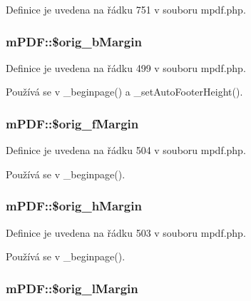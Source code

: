 Definice je uvedena na řádku 751 v souboru mpdf.\-php.

\hypertarget{classm_p_d_f_a2e908dbc80a64e5171b7b9d4f236c4c6}{
\subsubsection[{\$orig\-\_\-b\-Margin}]{\setlength{\rightskip}{0pt plus 5cm}m\-P\-D\-F\-::\$orig\-\_\-b\-Margin}}\label{classm_p_d_f_a2e908dbc80a64e5171b7b9d4f236c4c6}


Definice je uvedena na řádku 499 v souboru mpdf.\-php.



Používá se v \-\_\-beginpage() a \-\_\-set\-Auto\-Footer\-Height().

\hypertarget{classm_p_d_f_aa23dee3611c49dd27d5d7fe84614fb28}{
\subsubsection[{\$orig\-\_\-f\-Margin}]{\setlength{\rightskip}{0pt plus 5cm}m\-P\-D\-F\-::\$orig\-\_\-f\-Margin}}\label{classm_p_d_f_aa23dee3611c49dd27d5d7fe84614fb28}


Definice je uvedena na řádku 504 v souboru mpdf.\-php.



Používá se v \-\_\-beginpage().

\hypertarget{classm_p_d_f_ab6db5737d6640df2ed8f81d626c3f3fc}{
\subsubsection[{\$orig\-\_\-h\-Margin}]{\setlength{\rightskip}{0pt plus 5cm}m\-P\-D\-F\-::\$orig\-\_\-h\-Margin}}\label{classm_p_d_f_ab6db5737d6640df2ed8f81d626c3f3fc}


Definice je uvedena na řádku 503 v souboru mpdf.\-php.



Používá se v \-\_\-beginpage().

\hypertarget{classm_p_d_f_a1bcd5c7634c2e0f22f157c4c95a7f260}{
\subsubsection[{\$orig\-\_\-l\-Margin}]{\setlength{\rightskip}{0pt plus 5cm}m\-P\-D\-F\-::\$orig\-\_\-l\-Margin}}\label{classm_p_d_f_a1bcd5c7634c2e0f22f157c4c95a7f260}


